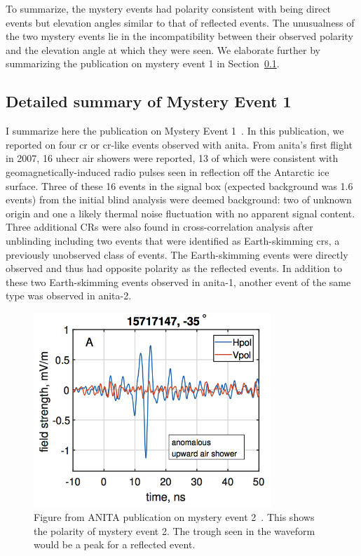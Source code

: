 To summarize, the mystery events had polarity consistent with being direct events but elevation angles similar to that of reflected events.
The unusualness of the two mystery events lie in the incompatibility between their observed polarity and the elevation angle at which they were seen.
We elaborate further by summarizing the publication on mystery event 1 in Section~\ref{summary_me1}. 


\subsection{Detailed summary of Mystery Event 1}
\label{summary_me1}

I summarize here the publication on Mystery Event 1~\cite{me1}. 
In this publication, we reported on four \gls{cr} or \gls{cr}-like events observed with \gls{anita}. From \gls{anita}’s first flight in 2007, 16 \gls{uhecr} air showers were reported, 13 of which were consistent with geomagnetically-induced radio pulses seen in reflection off the Antarctic ice surface. Three of these 16 events in the signal box (expected background was 1.6 events) from the initial blind analysis were deemed background: two of unknown origin and one a likely thermal noise fluctuation with no apparent signal content. Three additional CRs were also found in cross-correlation analysis after unblinding including two events that were identified as Earth-skimming \gls{cr}s, a previously unobserved class of events. The Earth-skimming events were directly observed and thus had opposite polarity as the reflected events. In addition to these two Earth-skimming events observed in \gls{anita}-1, another event of the same type was observed in \gls{anita}-2. 

\begin{figure}
\centering
\includegraphics[width=0.8\textwidth]{figures/polarity.png}
\caption{Figure from ANITA publication on mystery event 2~\cite{me2}. This shows the polarity of mystery event 2. 
The trough seen in the waveform would be a peak for a reflected event.}
\label{polarity_me2}
\end{figure}

